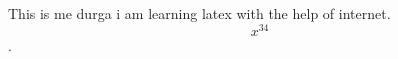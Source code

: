 \documentclass[12pt]{article}
\begin{document}
This is me durga i am learning latex with the help of internet.$$x^{34}$$.
\end{document}
